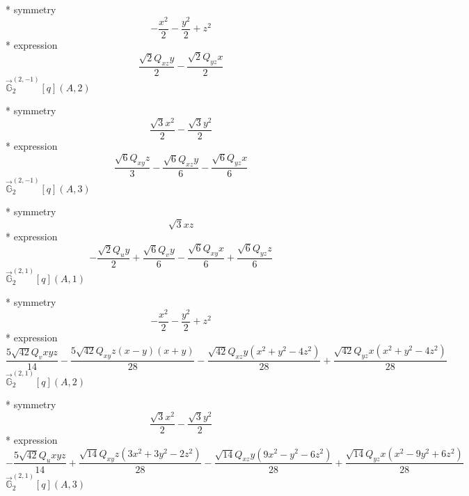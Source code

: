 \documentclass[fleqn,8pt]{jsarticle}
\begin{document}
\noindent\quad ** symmetry
\begin{dmath*}
- \frac{x^{2}}{2} - \frac{y^{2}}{2} + z^{2}
\end{dmath*}
\noindent\quad ** expression
\begin{dmath*}
\frac{\sqrt{2} Q_{xz} y}{2} - \frac{\sqrt{2} Q_{yz} x}{2}
\end{dmath*}
\noindent\quad $\vec{\mathbb{G}}_{2}^{(2,-1)}[q](A,2)$

\noindent\quad ** symmetry
\begin{dmath*}
\frac{\sqrt{3} x^{2}}{2} - \frac{\sqrt{3} y^{2}}{2}
\end{dmath*}
\noindent\quad ** expression
\begin{dmath*}
\frac{\sqrt{6} Q_{xy} z}{3} - \frac{\sqrt{6} Q_{xz} y}{6} - \frac{\sqrt{6} Q_{yz} x}{6}
\end{dmath*}
\noindent\quad $\vec{\mathbb{G}}_{2}^{(2,-1)}[q](A,3)$

\noindent\quad ** symmetry
\begin{dmath*}
\sqrt{3} x z
\end{dmath*}
\noindent\quad ** expression
\begin{dmath*}
- \frac{\sqrt{2} Q_{u} y}{2} + \frac{\sqrt{6} Q_{v} y}{6} - \frac{\sqrt{6} Q_{xy} x}{6} + \frac{\sqrt{6} Q_{yz} z}{6}
\end{dmath*}
\noindent\quad $\vec{\mathbb{G}}_{2}^{(2,1)}[q](A,1)$

\noindent\quad ** symmetry
\begin{dmath*}
- \frac{x^{2}}{2} - \frac{y^{2}}{2} + z^{2}
\end{dmath*}
\noindent\quad ** expression
\begin{dmath*}
\frac{5 \sqrt{42} Q_{v} x y z}{14} - \frac{5 \sqrt{42} Q_{xy} z \left(x - y\right) \left(x + y\right)}{28} - \frac{\sqrt{42} Q_{xz} y \left(x^{2} + y^{2} - 4 z^{2}\right)}{28} + \frac{\sqrt{42} Q_{yz} x \left(x^{2} + y^{2} - 4 z^{2}\right)}{28}
\end{dmath*}
\noindent\quad $\vec{\mathbb{G}}_{2}^{(2,1)}[q](A,2)$

\noindent\quad ** symmetry
\begin{dmath*}
\frac{\sqrt{3} x^{2}}{2} - \frac{\sqrt{3} y^{2}}{2}
\end{dmath*}
\noindent\quad ** expression
\begin{dmath*}
- \frac{5 \sqrt{42} Q_{u} x y z}{14} + \frac{\sqrt{14} Q_{xy} z \left(3 x^{2} + 3 y^{2} - 2 z^{2}\right)}{28} - \frac{\sqrt{14} Q_{xz} y \left(9 x^{2} - y^{2} - 6 z^{2}\right)}{28} + \frac{\sqrt{14} Q_{yz} x \left(x^{2} - 9 y^{2} + 6 z^{2}\right)}{28}
\end{dmath*}
\noindent\quad $\vec{\mathbb{G}}_{2}^{(2,1)}[q](A,3)$
\end{document}
